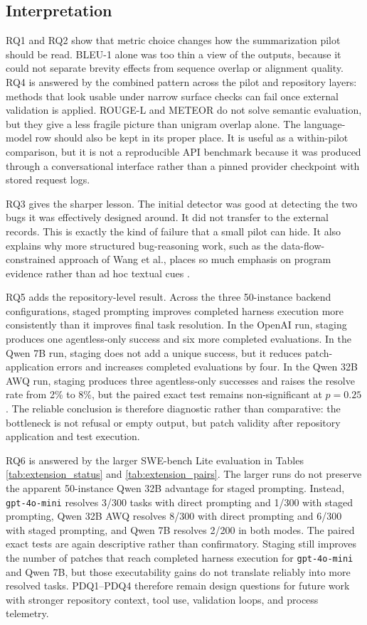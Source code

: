 \documentclass[preprint,12pt]{elsarticle}
\begin{document}
\subsection{Interpretation}

RQ1 and RQ2 show that metric choice changes how the summarization pilot should be read. BLEU-1 alone was too thin a view of the outputs, because it could not separate brevity effects from sequence overlap or alignment quality. RQ4 is answered by the combined pattern across the pilot and repository layers: methods that look usable under narrow surface checks can fail once external validation is applied. ROUGE-L and METEOR do not solve semantic evaluation, but they give a less fragile picture than unigram overlap alone. The language-model row should also be kept in its proper place. It is useful as a within-pilot comparison, but it is not a reproducible API benchmark because it was produced through a conversational interface rather than a pinned provider checkpoint with stored request logs.

RQ3 gives the sharper lesson. The initial detector was good at detecting the two bugs it was effectively designed around. It did not transfer to the external records. This is exactly the kind of failure that a small pilot can hide. It also explains why more structured bug-reasoning work, such as the data-flow-constrained approach of Wang et al., places so much emphasis on program evidence rather than ad hoc textual cues \cite{wang2024llmsan}.

RQ5 adds the repository-level result. Across the three 50-instance backend configurations, staged prompting improves completed harness execution more consistently than it improves final task resolution. In the OpenAI run, staging produces one agentless-only success and six more completed evaluations. In the Qwen 7B run, staging does not add a unique success, but it reduces patch-application errors and increases completed evaluations by four. In the Qwen 32B AWQ run, staging produces three agentless-only successes and raises the resolve rate from 2\% to 8\%, but the paired exact test remains non-significant at $p = 0.25$. The reliable conclusion is therefore diagnostic rather than comparative: the bottleneck is not refusal or empty output, but patch validity after repository application and test execution.

RQ6 is answered by the larger SWE-bench Lite evaluation in Tables \ref{tab:extension_status} and \ref{tab:extension_pairs}. The larger runs do not preserve the apparent 50-instance Qwen 32B advantage for staged prompting. Instead, \texttt{gpt-4o-mini} resolves 3/300 tasks with direct prompting and 1/300 with staged prompting, Qwen 32B AWQ resolves 8/300 with direct prompting and 6/300 with staged prompting, and Qwen 7B resolves 2/200 in both modes. The paired exact tests are again descriptive rather than confirmatory. Staging still improves the number of patches that reach completed harness execution for \texttt{gpt-4o-mini} and Qwen 7B, but those executability gains do not translate reliably into more resolved tasks. PDQ1--PDQ4 therefore remain design questions for future work with stronger repository context, tool use, validation loops, and process telemetry.
\end{document}
